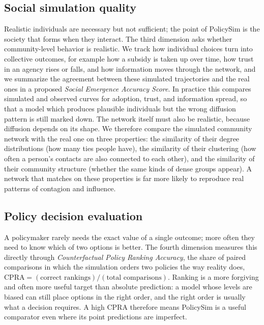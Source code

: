 \documentclass[conference]{IEEEtran}
\begin{document}
\subsection{Social simulation quality}
Realistic individuals are necessary but not sufficient; the point of PolicySim is the society that forms when they interact. The third dimension asks whether community-level behavior is realistic. We track how individual choices turn into collective outcomes, for example how a subsidy is taken up over time, how trust in an agency rises or falls, and how information moves through the network, and we summarize the agreement between these simulated trajectories and the real ones in a proposed \emph{Social Emergence Accuracy Score}. In practice this compares simulated and observed curves for adoption, trust, and information spread, so that a model which produces plausible individuals but the wrong diffusion pattern is still marked down. The network itself must also be realistic, because diffusion depends on its shape. We therefore compare the simulated community network with the real one on three properties: the similarity of their degree distributions (how many ties people have), the similarity of their clustering (how often a person's contacts are also connected to each other), and the similarity of their community structure (whether the same kinds of dense groups appear). A network that matches on these properties is far more likely to reproduce real patterns of contagion and influence.

\subsection{Policy decision evaluation}
A policymaker rarely needs the exact value of a single outcome; more often they need to know which of two options is better. The fourth dimension measures this directly through \emph{Counterfactual Policy Ranking Accuracy}, the share of paired comparisons in which the simulation orders two policies the way reality does, $\mathrm{CPRA} = (\text{correct rankings})/(\text{total comparisons})$. Ranking is a more forgiving and often more useful target than absolute prediction: a model whose levels are biased can still place options in the right order, and the right order is usually what a decision requires. A high CPRA therefore means PolicySim is a useful comparator even where its point predictions are imperfect.
\end{document}
